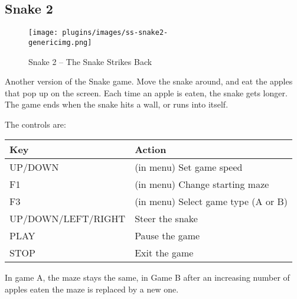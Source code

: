 \subsection{Snake 2}
\begin{figure}[h!]
\begin{center}
\texttt{[image: plugins/images/ss-snake2-\\genericimg.png]}
\end{center}
\caption{Snake 2 {--} The Snake Strikes Back}
\end{figure}

Another version of the Snake game. Move the snake around, and eat the
apples that pop up on the screen. Each time an apple is eaten, the
snake gets longer. The game ends when the snake hits a wall, or runs
into itself. 

The controls are:

\begin{table}[h!]
\begin{center}
\begin{tabular}{@{}ll@{}}\toprule
\textbf{Key} & \textbf{Action} \\\midrule
UP/DOWN & (in menu) Set game speed \\
F1 & (in menu) Change starting maze \\
F3 & (in menu) Select game type (A or B) \\
UP/DOWN/LEFT/RIGHT & Steer the snake \\
PLAY & Pause the game \\
STOP & Exit the game \\\bottomrule
\end{tabular}
\end{center}
\end{table}
In game A, the maze stays the same, in Game B
after an increasing number of apples eaten the maze is replaced by a
new one.

